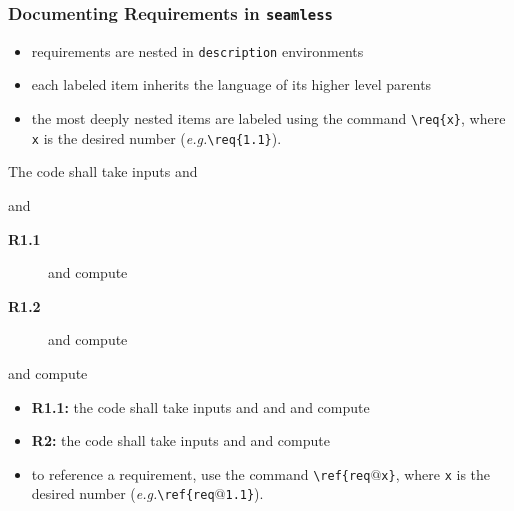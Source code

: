 \documentclass{beamer}
\makeatletter
\newcommand*{\eg}{\emph{e.g.}\@\xspace}
\newcommand*{\seamless}{\texttt{seamless}\@\xspace}
\makeatother
\begin{document}
\begin{frame}
  \frametitle{Documenting Requirements in \seamless}
  \begin{itemize}
    \item requirements are nested in \texttt{description} environments
    \item each labeled item inherits the language of its higher level parents
    \item the most deeply nested items are labeled using the command 
      \texttt{\textbackslash req\{x\}}, where \texttt{x} is the 
      desired number (\eg \texttt{\textbackslash req\{1.1\}}).
  \end{itemize}

  \begin{beamerbox}
    The code shall take inputs  and 
    \begin{description}
      \item and 
        \begin{description}
          \item[\textbf{R1.1}] and compute 
          \item[\textbf{R1.2}] and compute 
        \end{description}
      \item[\textbf{R2}] and compute 
    \end{description}
  \end{beamerbox}

  \begin{itemize}
    \item \textbf{R1.1:} the code shall take inputs  and  and 
      and compute 
    \item \textbf{R2:} the code shall take inputs  and  and compute 
    \item to reference a requirement, use the command \texttt{\textbackslash ref\{req$@$x\}}, 
      where \texttt{x} is the desired 
      number (\eg \texttt{\textbackslash ref\{req$@$1.1\}}).
  \end{itemize}
\end{frame}
\end{document}
